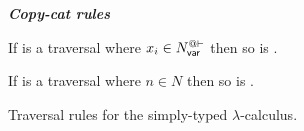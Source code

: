 \begin{FramedTable}
\emph{\bf Copy-cat rules}
\begin{description}
\item{}
If  is a traversal where $x_i \in
    N_{\sf var}^{@\vdash}$ then so is .

\item{}
  If  is a traversal where $n\in N$ then so is
.
\end{description}
\caption[Traversal rules for the simply-typed
lambda-calculus]{Traversal rules for the simply-typed
$\lambda$-calculus.}
\label{tab:trav_rules}
\end{FramedTable}

